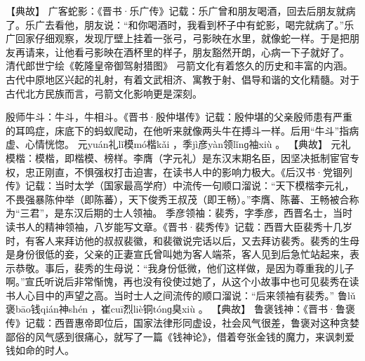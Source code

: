 \documentclass[12pt,UTF8]{ctexbook}
\begin{document}
【典故】
广客蛇影：《晋书·乐广传》记载：乐广曾和朋友喝酒，回去后朋友就病了。乐广去看他，朋友说：“和你喝酒时，我看到杯子中有蛇影，喝完就病了。”乐广回家仔细观察，发现厅壁上挂着一张弓，弓影映在水里，就像蛇一样。于是把朋友再请来，让他看弓影映在酒杯里的样子，朋友豁然开朗，心病一下子就好了。
清代郎世宁绘《乾隆皇帝御驾射猎图》
弓箭文化有着悠久的历史和丰富的内涵。古代中原地区兴起的礼射，有着文武相济、寓教于射、倡导和谐的文化精髓。对于古代北方民族而言，弓箭文化影响更是深刻。

殷师牛斗：牛斗，牛相斗。《晋书·殷仲堪传》记载：殷仲堪的父亲殷师患有严重的耳鸣症，床底下的蚂蚁爬动，在他听来就像两头牛在搏斗一样。后用“牛斗”指病虚、心情恍惚。
元yuán礼lǐ模mó楷kǎi
，季jì彦yàn领lǐnɡ袖xiù
。
【典故】
元礼模楷：模楷，即楷模、榜样。李膺（字元礼）是东汉末期名臣，因坚决抵制宦官专权，忠正刚直，不惧强权打击迫害，在读书人中的影响力极大。《后汉书·党锢列传》记载：当时太学（国家最高学府）中流传一句顺口溜说：“天下模楷李元礼，不畏强暴陈仲举（即陈蕃），天下俊秀王叔茂（即王畅）。”李膺、陈蕃、王畅被合称为“三君”，是东汉后期的士人领袖。
季彦领袖：裴秀，字季彦，西晋名士，当时读书人的精神领袖，八岁能写文章。《晋书·裴秀传》记载：西晋大臣裴秀十几岁时，有客人来拜访他的叔叔裴徽，和裴徽说完话以后，又去拜访裴秀。裴秀的生母是身份很低的妾，父亲的正妻宣氏曾叫她为客人端茶，客人见到后急忙站起来，表示恭敬。事后，裴秀的生母说：“我身份低微，他们这样做，是因为尊重我的儿子啊。”宣氏听说后非常惭愧，再也没有役使过她了，从这个小故事中也可见裴秀在读书人心目中的声望之高。当时士人之间流传的顺口溜说：“后来领袖有裴秀。”
鲁lǔ褒bāo钱qián神shén
，崔cuī烈liè铜tónɡ臭xiù
。
【典故】
鲁褒钱神：《晋书·鲁褒传》记载：西晋惠帝即位后，国家法律形同虚设，社会风气很差，鲁褒对这种贪婪鄙俗的风气感到很痛心，就写了一篇《钱神论》，借着夸张金钱的魔力，来讽刺爱钱如命的时人。
\end{document}
